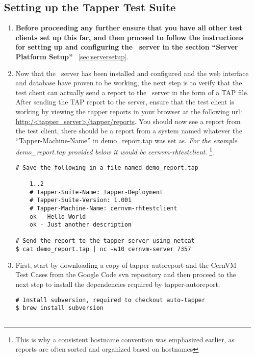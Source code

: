 \subsection{Setting up the Tapper Test Suite}
\label{sec:rhtestsuite}
\begin{enumerate}
\item 	{\bf Before proceeding any further ensure that you have all other test clients set up this far, and then proceed
		to follow the instructions for setting up and configuring the \tapper~server in the section ``Server Platform Setup''}		
		~\ref{sec:serversetup}.
		
\item 	Now that the \tapper~server has been installed and configured and the \tapper web interface and database have proven
		to be working, the next step is to verify that the test client can actually send a report to the \tapper~server in
		the form of a TAP file. After sending the TAP report to the server, ensure that the test client is working by viewing 
		the tapper reports in your browser at the following url: \url{http:/<tapper\_server>/tapper/reports}. You should now see a 
		report from the test client, there should be a report from a system named whatever the ``Tapper-Machine-Name'' in 
		demo\_report.tap was set as. \emph{For the example demo\_report.tap provided below it would be cernvm-rhtestclient}.
		\footnote{This is why a consistent hostname convention was emphasized earlier, as reports are often sorted and organized 
		based on hostnames}.
		
\lstset{language=bash,caption=Send a Basic Report to the \tapper~Server}
\begin{lstlisting}
# Save the following in a file named demo_report.tap

	1..2
	# Tapper-Suite-Name: Tapper-Deployment
	# Tapper-Suite-Version: 1.001
	# Tapper-Machine-Name: cernvm-rhtestclient
	ok - Hello World
	ok - Just another description

# Send the report to the tapper server using netcat
$ cat demo_report.tap | nc -w10 cernvm-server 7357
\end{lstlisting}

\item 	First, start by downloading a copy of tapper-autoreport and the CernVM Test Cases from the Google Code svn repository
		\cite{GCreleasetesting} and then proceed to the next step to install the dependencies required by tapper-autoreport.
		
\lstset{language=bash,caption=Install \tapper~AutoReport}
\begin{lstlisting}
# Install subversion, required to checkout auto-tapper
$ brew install subversion


\end{lstlisting}
\end{enumerate}
